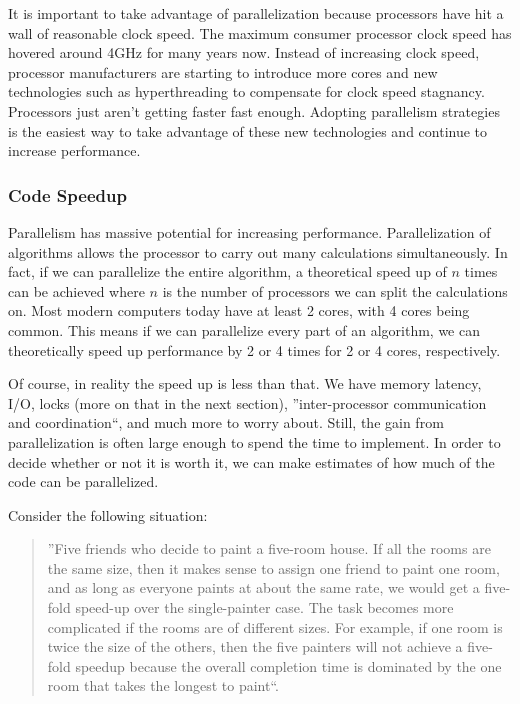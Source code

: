 \documentclass[letterpaper, 12pt]{article}
\begin{document}
\par\vspace{\baselineskip}

It is important to take advantage of parallelization because processors have hit a wall of
reasonable clock speed\citep{processorspeed}. The maximum consumer processor clock speed has
hovered around 4GHz for many years now. Instead of increasing clock speed, processor
manufacturers are starting to introduce more cores and new technologies such as hyperthreading
to compensate for clock speed stagnancy. Processors just aren't getting faster fast enough.
Adopting parallelism strategies is the easiest way to take advantage of these new technologies
and continue to increase performance.

\subsubsection{Code Speedup}
Parallelism has massive potential for increasing performance. Parallelization of algorithms
allows the processor to carry out many calculations simultaneously. In fact, if we can
parallelize the entire algorithm, a theoretical speed up of $n$ times can be
achieved where $n$ is the number of processors we can split the calculations on.
Most modern computers today have at least 2 cores, with 4 cores being common. This means
if we can parallelize every part of an algorithm, we can theoretically speed up performance
by 2 or 4 times for 2 or 4 cores, respectively.

\par\vspace{\baselineskip}
Of course, in reality the speed up is less than that. We have memory latency, I/O, locks
(more on that in the next section), ''inter-processor communication and coordination``\citep[p. 13]{artofmulti},
and much more to worry about. Still, the gain from parallelization is often large enough to spend
the time to implement. In order to decide whether or not it is worth it, we can make estimates of
how much of the code can be parallelized.

\par\vspace{\baselineskip}

\newpage
Consider the following situation:
\begin{quotation}
	''Five friends who decide to paint a five-room house. If all the rooms are the same size,
	then it makes sense to assign one friend to paint one room, and as long as everyone paints at
	about the same rate, we would get a five-fold speed-up over the single-painter case.
	The task becomes more complicated if the rooms are of different sizes. For example, if one
	room is twice the size of the others, then the five painters will not achieve a five-fold
	speedup because the overall completion time is dominated by the one room that takes the
	longest to paint``\citep[p. 13]{artofmulti}.
\end{quotation}
\end{document}
